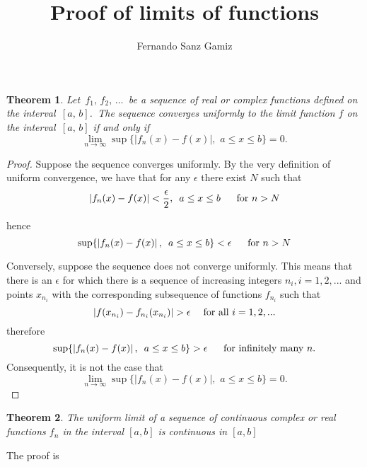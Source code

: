 \documentclass[12pt]{article}
\newtheorem{thm}{Theorem}
\newcommand{\abs}[1]{\left\vert#1\right\vert}
\begin{document}
\title{Proof of limits of functions}%
\author{Fernando Sanz Gamiz}%

\begin{thm}
Let\, $f_1,\,f_2,\,\ldots$\, be a sequence of real or complex
functions defined on the interval\, $[a,\,b]$.\, The sequence
converges uniformly to the \emph{limit function} $f$ on the
interval\, $[a,\,b]$ if and only if
$$\lim_{n\to\infty}\sup\{|f_n(x)-f(x)|, \,\, a \leq x \leq b\} = 0.$$
\end{thm}

\bigskip

\begin{proof}

Suppose the sequence converges uniformly. By the very definition of
uniform convergence, we have that for any $\epsilon$ there exist $N$
such that $$\abs{f_n(x)-f(x)}<\frac{\epsilon}{2}, \,\,\, a \leq x
\leq b \hspace{13 pt} \mbox{ for } n>N$$

\noindent hence $$\sup\{\abs{f_n(x)-f(x)}, \,\,\, a \leq x \leq b\}
<\epsilon \hspace{13 pt} \mbox{ for } n>N $$

\bigskip

\noindent Conversely, suppose the sequence does not converge
uniformly. This means that there is an $\epsilon$ for which there is
a sequence of increasing integers $n_i, i=1,2,...$ and points
$x_{n_i}$ with the corresponding subsequence of functions $f_{n_i}$
such that
$$\abs{f(x_{n_i})-f_{n_i}(x_{n_i})}>\epsilon \hspace{13 pt} \mbox{for all } i=1,2,...$$
therefore $$\sup\{\abs{f_n(x)-f(x)}, \,\,\, a \leq x \leq b\}
>\epsilon \hspace{13 pt} \mbox{ for infinitely many } n.$$
Consequently, it is not the case that
$$\lim_{n\to\infty}\sup\{|f_n(x)-f(x)|, \,\, a \leq x \leq b\} =
0.$$

\end{proof}

\begin{thm}
The uniform limit of a sequence of continuous complex or real
functions $f_n$ in the interval $[a,b]$ is continuous in $[a,b]$
\end{thm}

The proof is
\end{document}

